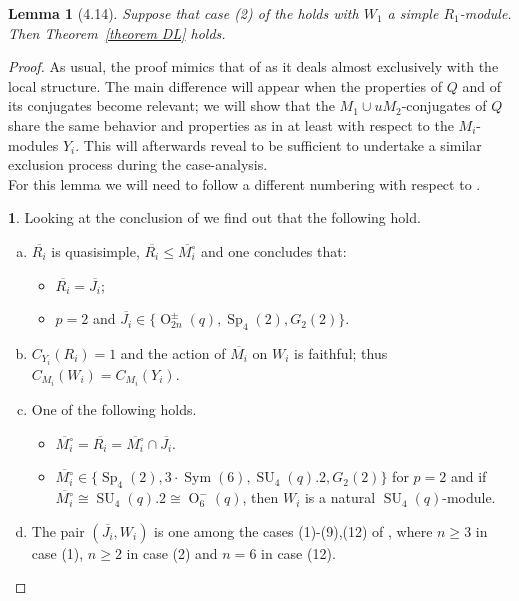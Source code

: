 \documentclass{amsart}
\numberwithin{equation}{section}
\newtheorem{lemma}[equation]{Lemma}
\theoremstyle{definition}
\theoremstyle{subresult}
\newtheorem{subresult}{}[equation]
\theoremstyle{caseresult}
\newcommand{\Sp}{\operatorname{Sp}}
\newcommand{\SU}{\operatorname{SU}}
\newcommand{\Sym}{\operatorname{Sym}}
\renewcommand{\O}{\operatorname{O}}
\newcommand{\ov}{\overline}
\newcommand{\<}{\langle}
\renewcommand{\>}{\rangle}
\begin{document}
\begin{lemma}[4.14]\label{lemma4.14}
	Suppose that case (2) of the   holds with $W_1$ a simple $R_1$-module. Then Theorem~\ref{theorem DL} holds.
\end{lemma}
\begin{proof}
	As usual, the proof mimics that of \cite[Lemma 4.14]{Meier-Stell-Stroth:2012} as it deals almost exclusively with the local structure. The main difference will appear when the properties of $Q$ and of its conjugates become relevant; we will show that the $M_1 \cup uM_2$-conjugates of $Q$ share the same behavior and properties as in \cite[Lemma 4.14]{Meier-Stell-Stroth:2012} at least with respect to the $M_i$-modules $Y_i$. This will afterwards reveal to be sufficient to undertake a similar exclusion process during the case-analysis.\\
	For this lemma we will need to follow a different numbering with respect to \cite[Lemma 4.14]{Meier-Stell-Stroth:2012}.
	
	\begin{subresult}\label{4.14-1}
		Looking at the conclusion of  we find out that the following hold.
		\begin{enumerate}[(a)]
			\item $\ov{R_i}$ is quasisimple, $\ov{R_i} \le \ov{M_i^\circ}$ and one concludes that:
			\begin{itemize}
				\item[i)] $\ov{R_i} =\ov{J_i}$;
				\item[ii)] $p=2$ and $\ov{J_i} \in \{ \O^\pm_{2n}(q), \Sp_4(2), G_2(2)\}$.
			\end{itemize}
			\item $C_{Y_i}(R_i) =1$ and the action of $\ov{M_i}$ on $W_i$ is faithful; thus $C_{M_i}(W_i) = C_{M_i}(Y_i)$.
			\item One of the following holds.
			\begin{itemize}
				\item[i)] $\ov{M_i^\circ} = \ov{R_i} = \ov{M_i^\circ} \cap \ov{J_i}$.
				\item[ii)] $\ov{M_i^\circ} \in \{\Sp_4(2), 3 \cdot \Sym(6), \SU_4(q).2, G_2(2)\}$ for $p=2$ and if $\ov{M_i^\circ} \cong \SU_4(q).2 \cong \O^-_6(q)$, then $W_i$ is a natural $\SU_4(q)$-module.
			\end{itemize}
			\item The pair $(\ov{J_i}, W_i)$ is one among the cases (1)-(9),(12) of \cite[Theorem C.3]{Meier-Stell-Stroth:2012}, where $n \ge 3$ in case (1), $n \ge 2$ in case (2) and $n=6$ in case (12).
		\end{enumerate}
	\end{subresult}
	

\end{proof}
\end{document}
